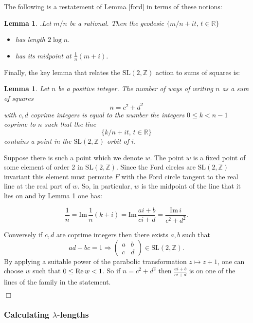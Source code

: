 \documentclass[12pt,a4paper]{amsart}
\newtheorem{lem}[thm]{Lemma}
\def\im{\mathrm{Im}\,}
\def\ZZ{\mathbb{Z}}
\def\RR{\mathbb{R}}
\def\sl2{\mathrm{SL}(2, \ZZ)}
\begin{document}
The following is a restatement of Lemma \ref{ford} in terms of these notions:

\begin{lem}.\label{calcul}
Let $m/n$ be a rational. 
Then the geodesic $\{ m/n + i t,\, t \in \RR \}$
\begin{itemize}
\item has  length $2\log n$. 
\item has its midpoint at $ \frac{1 }{n}(m + i).$
\end{itemize}
\end{lem}

Finally, the key lemma that relates the $\sl2$ action to sums of squares is:

\begin{lem} \label{squares}
Let $n$ be a positive integer.
The number of  ways of writing $n$  as a  sum of squares
$$n = c^2 + d^2$$
with $c,d$ coprime integers
is equal to the number the  integers $0 \leq k < n-1$ coprime to $n$
such that the line
$$\{  k/n + i t,\, t \in \RR \}$$
contains  a point in the $\sl2$  orbit of $i$.
\end{lem}


\proof  Suppose there is such  a point which we denote  $w$.
The point $w$ is a fixed point of some  element of order 2 in $\sl2$.
Since the Ford circles are $\sl2$ invariant
this element must permute $F$ with the Ford circle tangent 
to the real line  at the real part of $w$.
So, in particular, $w$ is the midpoint of the line 
that it lies on 
and by  Lemma \ref{calcul} one has:

$$\frac{1}{n} = \im \frac{1 }{n}(k + i)  
= \im  \frac{ai +b}{ci+d }
= \frac{\im i} {c^2 + d^2}.$$

Conversely if $c,d$ are coprime integers 
 then there exists $a,b$ such that
 $$ad - bc = 1 \Rightarrow  
 \begin{pmatrix}
 a & b \\
 c & d
 \end{pmatrix} \in \sl2.
$$
By applying a suitable power of the parabolic transformation 
$z \mapsto z + 1$,
one can choose $w$ such that $0 \leq \text{Re\,} w < 1$.
So if $n = c^2 + d^2$ then $\frac{ai +b}{ci+d }$
is on one of the lines of the family in the statement.

\hfill $\Box$

\subsubsection{Calculating $\lambda$-lengths}
\end{document}
